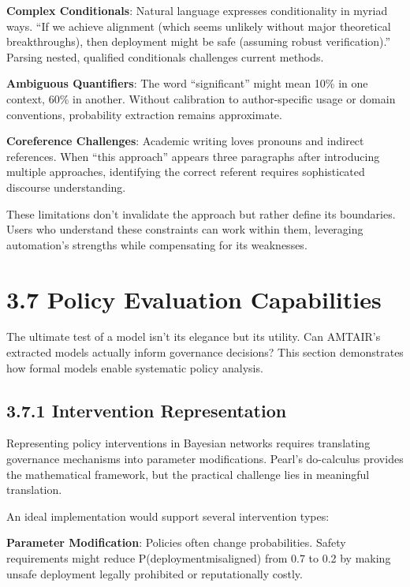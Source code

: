 \documentclass[
  11pt,
  letterpaper,
]{book}
\begin{document}
\textbf{Complex Conditionals}: Natural language expresses conditionality
in myriad ways. ``If we achieve alignment (which seems unlikely without
major theoretical breakthroughs), then deployment might be safe
(assuming robust verification).'' Parsing nested, qualified conditionals
challenges current methods.

\textbf{Ambiguous Quantifiers}: The word ``significant'' might mean 10\%
in one context, 60\% in another. Without calibration to author-specific
usage or domain conventions, probability extraction remains approximate.

\textbf{Coreference Challenges}: Academic writing loves pronouns and
indirect references. When ``this approach'' appears three paragraphs
after introducing multiple approaches, identifying the correct referent
requires sophisticated discourse understanding.

These limitations don't invalidate the approach but rather define its
boundaries. Users who understand these constraints can work within them,
leveraging automation's strengths while compensating for its weaknesses.

\section{3.7 Policy Evaluation
Capabilities}\label{sec-policy-evaluation}

The ultimate test of a model isn't its elegance but its utility. Can
AMTAIR's extracted models actually inform governance decisions? This
section demonstrates how formal models enable systematic policy
analysis.

\subsection{3.7.1 Intervention
Representation}\label{sec-intervention-representation}

Representing policy interventions in Bayesian networks requires
translating governance mechanisms into parameter modifications. Pearl's
do-calculus provides the mathematical framework, but the practical
challenge lies in meaningful translation.

An ideal implementation would support several intervention types:

\textbf{Parameter Modification}: Policies often change probabilities.
Safety requirements might reduce P(deployment\textbar misaligned) from
0.7 to 0.2 by making unsafe deployment legally prohibited or
reputationally costly.
\end{document}
